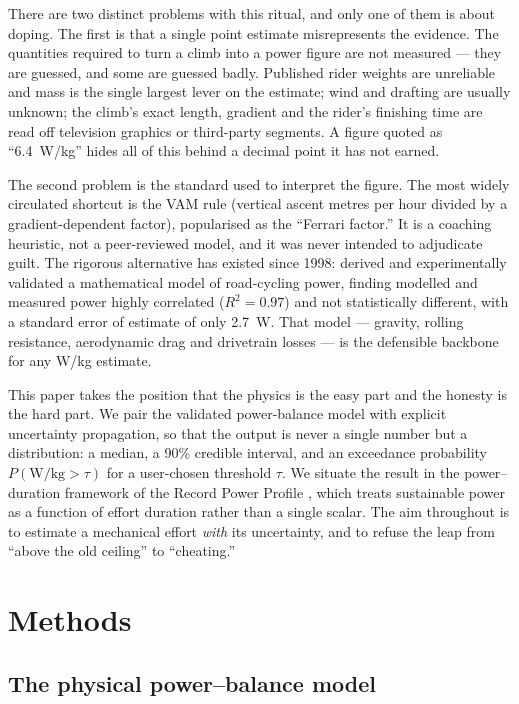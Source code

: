 \documentclass[11pt]{article}
\begin{document}
There are two distinct problems with this ritual, and only one of them is about
doping. The first is that a single point estimate misrepresents the evidence.
The quantities required to turn a climb into a power figure are not measured ---
they are guessed, and some are guessed badly. Published rider weights are
unreliable and mass is the single largest lever on the estimate; wind and
drafting are usually unknown; the climb's exact length, gradient and the rider's
finishing time are read off television graphics or third-party segments. A
figure quoted as ``\num{6.4}~W/kg'' hides all of this behind a decimal point it
has not earned.

The second problem is the standard used to interpret the figure. The most widely
circulated shortcut is the VAM rule (vertical ascent metres per hour divided by a
gradient-dependent factor), popularised as the ``Ferrari factor.'' It is a
coaching heuristic, not a peer-reviewed model, and it was never intended to
adjudicate guilt. The rigorous alternative has existed since 1998:
\citet{martin1998} derived and experimentally validated a mathematical model of
road-cycling power, finding modelled and measured power highly correlated
($R^2=0.97$) and not statistically different, with a standard error of estimate
of only \SI{2.7}{\watt}. That model --- gravity, rolling resistance, aerodynamic
drag and drivetrain losses --- is the defensible backbone for any W/kg estimate.

This paper takes the position that the physics is the easy part and the honesty
is the hard part. We pair the validated power-balance model with explicit
uncertainty propagation, so that the output is never a single number but a
distribution: a median, a 90\% credible interval, and an exceedance probability
$P(\text{W/kg}>\tau)$ for a user-chosen threshold $\tau$. We situate the result
in the power--duration framework of the Record Power Profile
\citep{pinot2011}, which treats sustainable power as a function of effort
duration rather than a single scalar. The aim throughout is to estimate a
mechanical effort \emph{with} its uncertainty, and to refuse the leap from ``above
the old ceiling'' to ``cheating.''

\section{Methods}

\subsection{The physical power--balance model}
\end{document}
